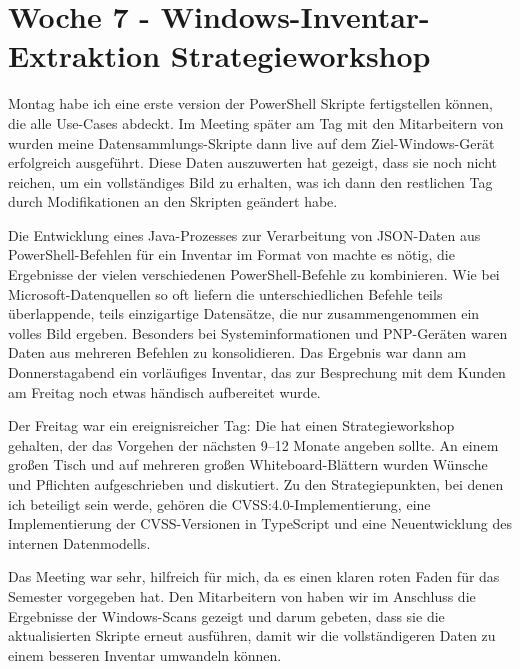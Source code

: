 \section{Woche 7 - Windows-Inventar-Extraktion \headerand Strategieworkshop} \label{sec:bericht-wo-7}


\lweekdaymarginpar{\weekdayMondayShort, \weekdayTuesdayShort}

Montag habe ich eine erste version der PowerShell Skripte fertigstellen können, die alle Use-Cases abdeckt.
Im Meeting später am Tag mit den Mitarbeitern von {\aeclientZEZESE} wurden meine Datensammlungs-Skripte dann live auf dem Ziel-Windows-Gerät erfolgreich ausgeführt.
Diese Daten auszuwerten hat gezeigt, dass sie noch nicht reichen, um ein vollständiges Bild zu erhalten, was ich dann den restlichen Tag durch Modifikationen an den Skripten geändert habe.

\sweekdaymarginpar{\weekdayWednesdayShort, \weekdayThursdayShort}

Die Entwicklung eines Java-Prozesses zur Verarbeitung von JSON-Daten aus PowerShell-Befehlen für ein Inventar im Format von {\metaeffekt} machte es nötig, die Ergebnisse der vielen verschiedenen PowerShell-Befehle zu kombinieren.
Wie bei Microsoft-Datenquellen so oft liefern die unterschiedlichen Befehle teils überlappende, teils einzigartige Datensätze, die nur zusammengenommen ein volles Bild ergeben.
Besonders bei Systeminformationen und PNP-Geräten waren Daten aus mehreren Befehlen zu konsolidieren.
Das Ergebnis war dann am Donnerstagabend ein vorläufiges Inventar, das zur Besprechung mit dem Kunden am Freitag noch etwas händisch aufbereitet wurde.

\sweekdaymarginpar{\weekdayFridayLong}

Der Freitag war ein ereignisreicher Tag:
Die {\metaeffekt} hat einen Strategieworkshop gehalten, der das Vorgehen der nächsten 9--12 Monate angeben sollte.
An einem großen Tisch und auf mehreren großen Whiteboard-Blättern wurden Wünsche und Pflichten aufgeschrieben und diskutiert.
Zu den Strategiepunkten, bei denen ich beteiligt sein werde, gehören die CVSS:4.0-Implementierung, eine Implementierung der CVSS-Versionen in TypeScript und eine Neuentwicklung des internen Datenmodells.

Das Meeting war sehr, hilfreich für mich, da es einen klaren roten Faden für das Semester vorgegeben hat.
Den Mitarbeitern von {\aeclientZEZESE} haben wir im Anschluss die Ergebnisse der Windows-Scans gezeigt und darum gebeten, dass sie die aktualisierten Skripte erneut ausführen, damit wir die vollständigeren Daten zu einem besseren Inventar umwandeln können.
